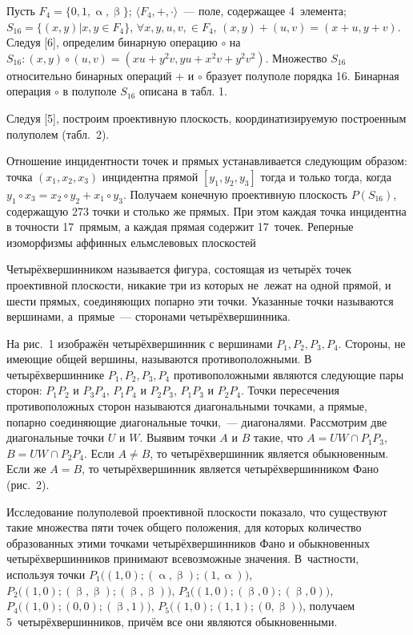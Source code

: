 Пусть $F_4 = \lbrace0,1,\upalpha,\upbeta\rbrace$; $\langle F_4,+,\cdot \rangle$~--- поле, содержащее 4~элемента;\\ $S_{16} = \lbrace (x,y)|x,y \in F_4 \rbrace$, $\forall x,y,u,v, \in F_4$, $(x,y)+(u,v)=(x+u,y+v)$. Следуя [6], определим бинарную операцию $\circ$ на $S_{16} : (x,y)\circ(u,v) = (xu+y^2v, yu+x^2v+y^2v^2)$. Множество $S_{16}$
относительно бинарных операций $+$ и $\circ$ бразует полуполе порядка 16. Бинарная операция $\circ$ в полуполе $S_{16}$ описана в табл. 1.



Следуя [5], построим проективную плоскость, координатизируемую построенным полуполем (табл.~2).



Отношение инцидентности точек и прямых устанавливается следующим образом: точка $(x_1,x_2,x_3)$ инцидентна прямой $[y_1,y_2,y_3]$ тогда и только тогда, когда $y_1 \circ x_3 = x_2 \circ y_2 + x_1 \circ y_3$. Получаем конечную проективную плоскость $P(S_{16})$, содержащую 273 точки и столько же прямых. При этом каждая точка инцидентна в точности 17~прямым, а каждая прямая содержит 17~точек.
Реперные изоморфизмы аффинных ельмслевовых плоскостей


Четырёхвершинником называется  фигура, состоящая из четырёх точек проективной плоскости, никакие три из которых не~лежат на одной прямой, и шести прямых, соединяющих попарно эти точки. Указанные точки называются вершинами, а~прямые~--- сторонами четырёхвершинника.

На рис.~1 изображён четырёхвершинник с вершинами $P_1, P_2, P_3, P_4$. Стороны, не имеющие общей вершины, называются противоположными. В четырёхвершиннике $P_1, P_2, P_3, P_4$ противоположными являются следующие пары сторон: $P_1P_2$ и $P_3P_4$, $P_1P_4$ и $P_2P_3$, $P_1P_3$ и $P_2P_4$. Точки пересечения противоположных сторон называются диагональными точками, а прямые, попарно соединяющие диагональные точки,~--- диагоналями. Рассмотрим две диагональные точки $U$ и $W$. Выявим точки $A$ и $B$ такие, что $A = UW \cap P_1P_3$, $B = UW \cap P_2P_4$. Если $A \neq B$, то четырёхвершинник является обыкновенным. Если же $A = B$, то четырёхвершинник является четырёхвершинником Фано (рис.~2).

\vspace{-8pt}


\clearpage


Исследование полуполевой проективной плоскости  показало, что существуют такие множества пяти точек общего положения, для которых количество образованных этими точками четырёхвершинников Фано и обыкновенных четырёхвершинников принимают всевозможные значения. В~частности, используя точки $P_1 \bigl((1,0);(\upalpha,\upbeta);(1,\upalpha)\bigr)$, $P_2 \bigl((1,0);(\upbeta,\upbeta);(\upbeta,\upbeta)\bigr)$, $P_3 \bigl((1,0);(\upbeta,0);(\upbeta,0)\bigr)$, $P_4 \bigl((1,0);(0,0);(\upbeta,1)\bigr)$, $P_5 \bigl((1,0);(1,1);(0,\upbeta)\bigr)$,  получаем 5~четырёхвершинников, причём все они являются обыкновенными.

